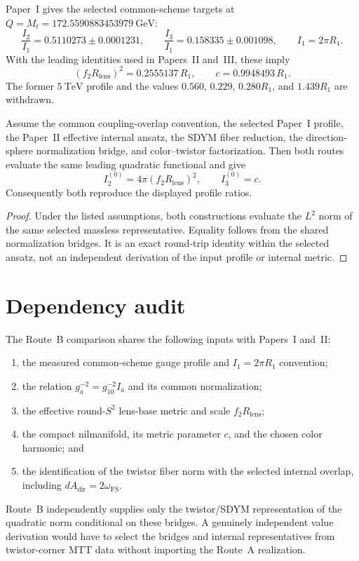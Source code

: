 \documentclass[11pt]{article}
\begin{document}
Paper~I gives the selected common-scheme targets at
$Q=M_t=172.5590883453979~\mathrm{GeV}$:
\[
\frac{I_2}{I_1}=0.5110273\pm0.0001231,
\qquad
\frac{I_3}{I_1}=0.158335\pm0.001098,
\qquad
I_1=2\pi R_1.
\]
With the leading identities used in Papers~II and~III, these imply
\[
(f_2R_{\mathrm{lens}})^2=0.2555137\,R_1,
\qquad
c=0.9948493\,R_1.
\]
The former $5~\mathrm{TeV}$ profile and the values $0.560$, $0.229$,
$0.280R_1$, and $1.439R_1$ are withdrawn.

\begin{theorem}
Assume the common coupling-overlap convention, the selected Paper~I profile,
the Paper~II effective internal ansatz, the SDYM fiber reduction, the
direction-sphere normalization bridge, and color--twistor factorization. Then
both routes evaluate the same leading quadratic functional and give
\[
I_2^{(0)}=4\pi(f_2R_{\mathrm{lens}})^2,
\qquad
I_3^{(0)}=c.
\]
Consequently both reproduce the displayed profile ratios.
\end{theorem}

\begin{proof}
Under the listed assumptions, both constructions evaluate the $L^2$ norm of
the same selected massless representative. Equality follows from the shared
normalization bridges. It is an exact round-trip identity within the selected
ansatz, not an independent derivation of the input profile or internal metric.
\end{proof}

\section{Dependency audit}

The Route~B comparison shares the following inputs with Papers~I and~II:
\begin{enumerate}
\item the measured common-scheme gauge profile and $I_1=2\pi R_1$ convention;
\item the relation $g_a^{-2}=g_{10}^{-2}I_a$ and its common normalization;
\item the effective round-$S^2$ lens-base metric and scale
$f_2R_{\mathrm{lens}}$;
\item the compact nilmanifold, its metric parameter $c$, and the chosen color
harmonic; and
\item the identification of the twistor fiber norm with the selected internal
overlap, including $dA_{\mathrm{dir}}=2\omega_{\mathrm{FS}}$.
\end{enumerate}
Route~B independently supplies only the twistor/SDYM representation of the
quadratic norm conditional on these bridges. A genuinely independent value
derivation would have to select the bridges and internal representatives from
twistor-corner MTT data without importing the Route~A realization.
\end{document}
